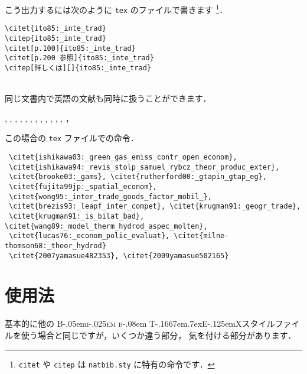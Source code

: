 \documentclass[article]{jlreq}
\newcommand{\BibTeX}{\textrm{B\kern-.05em\textsc{i\kern-.025em b}\kern-.08em%
T\kern-.1667em\lower.7ex\hbox{E}\kern-.125emX}}
\begin{document}
こう出力するには次のように \texttt{tex} のファイルで書きます
\footnote{\texttt{citet} や \texttt{citep} は \texttt{natbib.sty} に特有の命令です．}．

\begin{screen}
 \begin{verbatim}
\citet{ito85:_inte_trad}
\citep{ito85:_inte_trad}
\citet[p.100]{ito85:_inte_trad}
\citet[p.200 参照]{ito85:_inte_trad}
\citep[詳しくは][]{ito85:_inte_trad}
 \end{verbatim}
\end{screen}
\\

同じ文書内で英語の文献も同時に扱うことができます．

\begin{screen}
 \citet{ishikawa03:_green_gas_emiss_contr_open_econom},
 \citet{ishikawa94:_revis_stolp_samuel_rybcz_theor_produc_exter},
 \citet{brooke03:_gams},
 \citet{rutherford00:_gtapin_gtap_eg},
 \citet{fujita99jp:_spatial_econom},
 \citet{wong95:_inter_trade_goods_factor_mobil_},
 \citet{brezis93:_leapf_inter_compet},
 \citet{krugman91:_geogr_trade},
 \citet{krugman91:_is_bilat_bad},
 \citet{wang89:_model_therm_hydrod_aspec_molten},
 \citet{lucas76:_econom_polic_evaluat},
 \citet{milne-thomson68:_theor_hydrod},
 \citet{2007yamasue482353}，
 \citet{2009yamasue502165} 
\end{screen}

この場合の \texttt{tex} ファイルでの命令．

\begin{screen}
\begin{verbatim}
 \citet{ishikawa03:_green_gas_emiss_contr_open_econom},
 \citet{ishikawa94:_revis_stolp_samuel_rybcz_theor_produc_exter},
 \citet{brooke03:_gams}, \citet{rutherford00:_gtapin_gtap_eg},
 \citet{fujita99jp:_spatial_econom},
 \citet{wong95:_inter_trade_goods_factor_mobil_},
 \citet{brezis93:_leapf_inter_compet}, \citet{krugman91:_geogr_trade},
 \citet{krugman91:_is_bilat_bad}, \citet{wang89:_model_therm_hydrod_aspec_molten},
 \citet{lucas76:_econom_polic_evaluat}, \citet{milne-thomson68:_theor_hydrod}
 \citet{2007yamasue482353}, \citet{2009yamasue502165} 
\end{verbatim}
\end{screen}


\section{使用法}

基本的に他の \BibTeX スタイルファイルを使う場合と同じですが，いくつか違う部分，
気を付ける部分があります．
\end{document}
